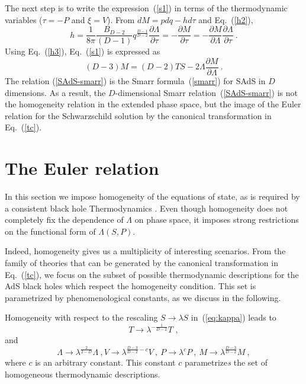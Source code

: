\documentclass[prd,onecolumn,notitlepage,amsmath,nofootinbib,superscriptaddress,showpacs,showkeys]{revtex4-1}
\begin{document}
The next step is to write the expression~(\ref{s1}) in terms of
the thermodynamic variables ($\tau=-P$ and $\xi=V$). From $dM=pdq-hd\tau$
and Eq.~(\ref{h2}), 
\begin{equation}
h=\frac{1}{8\pi}\frac{B_{D-2}}{\left(D-1\right)}q^{\frac{D-1}{D-2}}\frac{\partial\Lambda}{\partial\tau}=-\frac{\partial M}{\partial\tau}=-\frac{\partial M}{\partial\Lambda}\frac{\partial\Lambda}{\partial\tau}~.\label{h3}
\end{equation}
Using Eq.~(\ref{h3}), Eq.~(\ref{s1}) is expressed as 
\begin{equation}
\left(D-3\right)M=\left(D-2\right)TS-2\Lambda\frac{\partial M}{\partial\Lambda}~.\label{SAdS-smarr}
\end{equation}
The relation (\ref{SAdS-smarr}) is the Smarr formula~(\ref{smarr})
for SAdS in $D$ dimensions. As a result, the $D$-dimensional Smarr
relation~(\ref{SAdS-smarr}) is not the homogeneity relation in the
extended phase space, but the image of the Euler relation for the
Schwarzschild solution by the canonical transformation in Eq.~(\ref{tc}).


\section{\label{sec:The-Euler-relation}The Euler relation}

In this section we impose homogeneity of the equations of state, as
is required by a consistent black hole Thermodynamics \cite{bel2-2005,bel2005}.
Even though homogeneity does not completely fix the dependence
of $\Lambda$ on phase space, it imposes strong restrictions on the
functional form of $\Lambda\left(S,P\right)$.

Indeed, homogeneity gives us a multiplicity of interesting scenarios.
From the family of theories that can be generated by the canonical
transformation in Eq.~(\ref{tc}), we focus on the subset of possible
thermodynamic descriptions for the AdS black holes which respect the
homogeneity condition. This set is parametrized by phenomenological
constants, as we discuss in the following.

Homogeneity with respect to the rescaling $S\rightarrow\lambda S$
in~(\ref{eq:kappa}) leads to 
\begin{equation}
T\rightarrow\lambda^{-\frac{1}{D-2}}T\,\,,
\end{equation}
and 
\begin{equation}
\Lambda\rightarrow\lambda^{\frac{2}{2-D}}\Lambda~,V\rightarrow\lambda^{\frac{D-3}{D-2}-c}V~,\ P\rightarrow\lambda^{c}P~,\ M\rightarrow\lambda^{\frac{D-3}{D-2}}M~,
\end{equation}
where $c$ is an arbitrary constant. This constant $c$ parametrize\emph{s}
the set of homogeneous thermodynamic descriptions.
\end{document}
